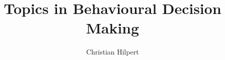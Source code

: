 \documentclass[a4paper, 12pt]{article}
\newcommand{\papertitle}{\large Topics in Behavioural Decision Making}
\begin{document}

 \frenchspacing

\title{\sffamily\bfseries%
	\papertitle%
}

\author[a]{Christian Hilpert}


\date{}

\maketitle
\renewcommand{\blindmarkup}[1]{\emph{#1}}
\blindmathfalse



\nocite{AzevedoGottlieb2012,Barberis2012a,Barberis2013a,Barberis2017Talk,KahnemanTversky1979,KoeszegiRabin2006,KoeszegiRabin2007,Rabin2000,Thaler2016,TverskyKahneman1992,Wakker2010}

\begin{refcontext}[sorting=nyt]  %
\printbibliography[heading=bibintoc]
\end{refcontext}
\end{document}
